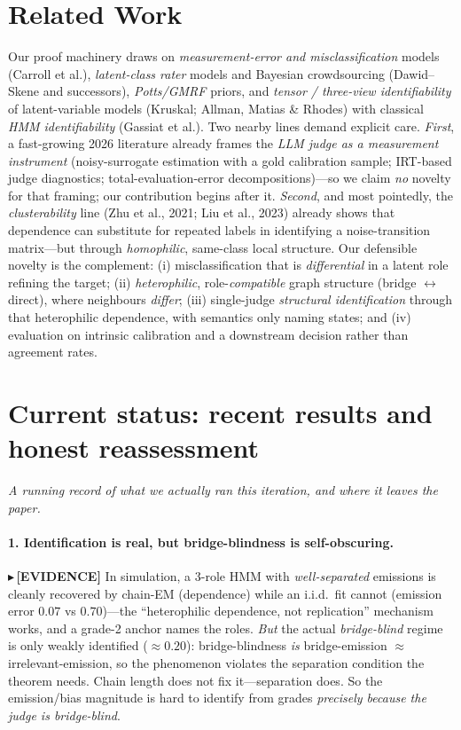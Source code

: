 \documentclass[11pt]{article}
\newcommand{\TESTED}[1]{{\color{teal}\small$\blacktriangleright$\,\textbf{[EVIDENCE]} #1}}
\begin{document}
\section{Related Work}
Our proof machinery draws on \emph{measurement-error and misclassification} models (Carroll et al.),
\emph{latent-class rater} models and Bayesian crowdsourcing (Dawid--Skene and successors), \emph{Potts/GMRF}
priors, and \emph{tensor / three-view identifiability} of latent-variable models (Kruskal; Allman, Matias \&
Rhodes) with classical \emph{HMM identifiability} (Gassiat et al.). Two nearby lines demand explicit care.
\emph{First}, a fast-growing 2026 literature already frames the \emph{LLM judge as a measurement instrument}
(noisy-surrogate estimation with a gold calibration sample; IRT-based judge diagnostics; total-evaluation-error
decompositions)---so we claim \emph{no} novelty for that framing; our contribution begins after it.
\emph{Second}, and most pointedly, the \emph{clusterability} line (Zhu et al., 2021; Liu et al., 2023) already
shows that dependence can substitute for repeated labels in identifying a noise-transition matrix---but through
\emph{homophilic}, same-class local structure. Our defensible novelty is the complement: (i) misclassification
that is \emph{differential} in a latent role refining the target; (ii) \emph{heterophilic}, role-\emph{compatible}
graph structure (bridge $\leftrightarrow$ direct), where neighbours \emph{differ}; (iii) single-judge
\emph{structural identification} through that heterophilic dependence, with semantics only naming states; and
(iv) evaluation on intrinsic calibration and a downstream decision rather than agreement rates.

\section{Current status: recent results and honest reassessment}\label{sec:status}
\emph{A running record of what we actually ran this iteration, and where it leaves the paper.}

\paragraph{1. Identification is real, but bridge-blindness is self-obscuring.}
\TESTED{In simulation, a 3-role HMM with \emph{well-separated} emissions is cleanly recovered by chain-EM
(dependence) while an i.i.d.\ fit cannot (emission error $0.07$ vs $0.70$)---the ``heterophilic dependence, not
replication'' mechanism works, and a grade-2 anchor names the roles. \emph{But} the actual \emph{bridge-blind}
regime is only weakly identified ($\approx0.20$): bridge-blindness \emph{is} bridge-emission $\approx$
irrelevant-emission, so the phenomenon violates the separation condition the theorem needs. Chain length does not
fix it---separation does. So the emission/bias magnitude is hard to identify from grades \emph{precisely because
the judge is bridge-blind}.}
\end{document}
